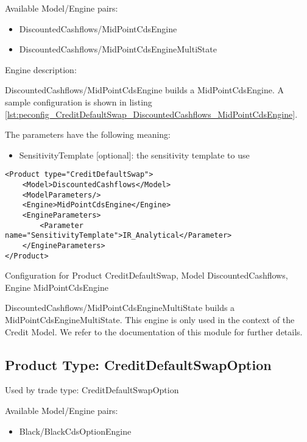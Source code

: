 Available Model/Engine pairs:

\begin{itemize}
\item DiscountedCashflows/MidPointCdsEngine
\item DiscountedCashflows/MidPointCdsEngineMultiState
\end{itemize}

Engine description:

DiscountedCashflows/MidPointCdsEngine builds a MidPointCdsEngine. A sample configuration is shown in listing
\ref{lst:peconfig_CreditDefaultSwap_DiscountedCashflows_MidPointCdsEngine}.

The parameters have the following meaning:

\begin{itemize}
\item SensitivityTemplate [optional]: the sensitivity template to use 
\end{itemize}

\begin{longlisting}
\begin{verbatim}
<Product type="CreditDefaultSwap">
    <Model>DiscountedCashflows</Model>
    <ModelParameters/>
    <Engine>MidPointCdsEngine</Engine>
    <EngineParameters>
        <Parameter name="SensitivityTemplate">IR_Analytical</Parameter>
    </EngineParameters>
</Product>
\end{verbatim}
\caption{Configuration for Product CreditDefaultSwap, Model DiscountedCashflows, Engine MidPointCdsEngine}
\label{lst:peconfig_CreditDefaultSwap_DiscountedCashflows_MidPointCdsEngine}
\end{longlisting}

DiscountedCashflows/MidPointCdsEngineMultiState builds a MidPointCdsEngineMultiState. This engine is only used in the
context of the Credit Model. We refer to the documentation of this module for further details.

\subsection{Product Type: CreditDefaultSwapOption}

Used by trade type: CreditDefaultSwapOption

Available Model/Engine pairs:

\begin{itemize}
\item Black/BlackCdsOptionEngine
\end{itemize}

